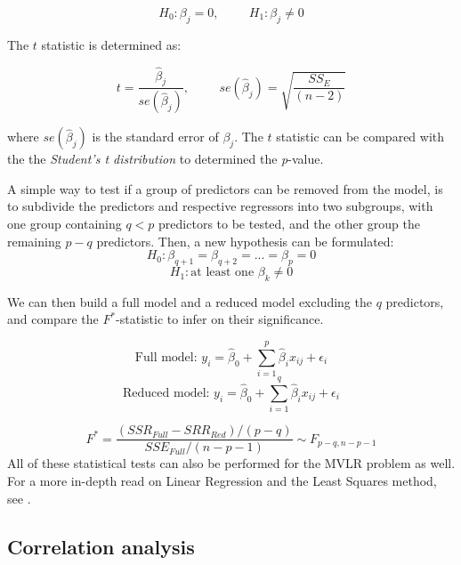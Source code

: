 \documentclass[12pt]{article}
\begin{document}
{\[
H_{0}: \beta_{j} = 0, \hspace{1cm} H_{1}: \beta_{j}  \neq 0
\]

The $t$ statistic is determined as:

\begin{equation}
t = \frac{\hat \beta_{j}}{se(\hat \beta_{j})}, \hspace{1cm} se(\hat \beta_{j}) = \sqrt{\frac{SS_{E}}{(n-2)}}
\end{equation}

where $se(\hat \beta_{j})$ is the standard error of $\beta_{j}$. The $t$ statistic can be compared with the the \textit{Student's t distribution} to determined the \textit{p}-value.

A simple way to test if a group of predictors can be removed from the model, is to subdivide the predictors and respective regressors into two subgroups, with one group containing $q<p$ predictors to be tested, and the other group the remaining $p-q$ predictors. Then, a new hypothesis can be formulated:
\[
H_{0}: \beta_{q+1} = \beta_{q+2} = ... = \beta_{p} = 0
\]
\[
H_{1}: \text{at least one } \beta_{k}  \neq 0
\]

We can then build a full model and a reduced model excluding the $q$ predictors, and compare the $F^{*}$-statistic to infer on their significance.

\[
\text{Full model: } y_{i}=\hat\beta_{0}+\sum^{p}_{i=1}\hat \beta_{i}x_{ij}+\epsilon_{i} 
\]
\[
\text{Reduced model: } y_{i}=\hat \beta_{0}+\sum^{q}_{i=1}\hat \beta_{i}x_{ij}+\epsilon_{i}
\]

\begin{equation}
  F^{*}=\frac{(SSR_{Full}-SRR_{Red})/(p-q)}{SSE_{Full}/(n-p-1)} \sim F_{p-q,n-p-1}
\end{equation}
All of these statistical tests can also be performed for the MVLR problem as well.
For a more in-depth read on Linear Regression and the Least Squares method, see \cite{ElementsStatisticalLearning}.

\subsection{Correlation analysis}

}
\end{document}
